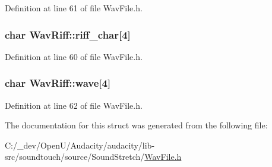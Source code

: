 Definition at line 61 of file Wav\+File.\+h.

\subsubsection[{\texorpdfstring{riff\+\_\+char}{riff_char}}]{\setlength{\rightskip}{0pt plus 5cm}char Wav\+Riff\+::riff\+\_\+char\mbox{[}4\mbox{]}}\hypertarget{struct_wav_riff_a3a837eae50605a8970a32ff4436dbac2}{}\label{struct_wav_riff_a3a837eae50605a8970a32ff4436dbac2}


Definition at line 60 of file Wav\+File.\+h.

\subsubsection[{\texorpdfstring{wave}{wave}}]{\setlength{\rightskip}{0pt plus 5cm}char Wav\+Riff\+::wave\mbox{[}4\mbox{]}}\hypertarget{struct_wav_riff_ac7f63e2ddeb71c3915914e044f0a2cba}{}\label{struct_wav_riff_ac7f63e2ddeb71c3915914e044f0a2cba}


Definition at line 62 of file Wav\+File.\+h.



The documentation for this struct was generated from the following file\+:\begin{DoxyCompactItemize}
\item 
C\+:/\+\_\+dev/\+Open\+U/\+Audacity/audacity/lib-\/src/soundtouch/source/\+Sound\+Stretch/\hyperlink{_wav_file_8h}{Wav\+File.\+h}\end{DoxyCompactItemize}
